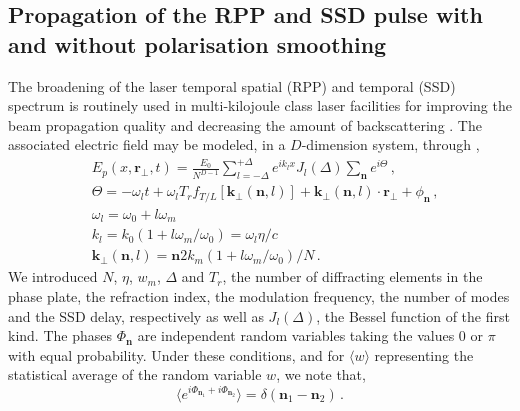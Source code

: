 \documentclass[
 reprint,
 amsmath,amssymb,
 aps,
]{revtex4-1}
\begin{document}
\subsection{Propagation of the RPP and  SSD pulse with and without polarisation smoothing}
The broadening of the  laser temporal spatial (RPP) and temporal (SSD) spectrum \cite{Kato_1984,Skupski_1989} is  routinely used in multi-kilojoule class laser facilities for improving the beam propagation quality \cite[]{NatPhys_Glenzer,NatPhys_Labaune,POP_Delamater_2000} and decreasing the amount of backscattering \cite[]{POP_Duluc_2019}. 
The associated electric field may be modeled, in a $D$-dimension system,  through \cite[]{POP_Rose_98,Rothenberg_97,Videau_1999}, 
\begin{align}
    &E_p(x,\mathbf{r}_\perp,t) =\frac{E_0}{N^{D-1}} \sum_{l=-\Delta}^{+\Delta}  e^{i k_l x }J_l(\Delta) \sum_{\mathbf{n} }  
    e^{i\Theta}
    \, , \label{eq:essd}  \\
   & \Theta = -\omega_lt +\omega_l T_{r} f_{T/L}[\mathbf{k}_\perp(\mathbf{n},l)] + \mathbf{k}_\perp(\mathbf{n},l)\cdot \mathbf{r}_\perp +\phi_{\mathbf{n}} \, ,\\
   & \omega_l= \omega_0+l \omega_m \\
   & k_l = k_0(1+l\omega_m/\omega_0 ) = \omega_l\eta /c \\
    &\mathbf{k}_{\perp }( \mathbf{n},l)= \mathbf{n}  2k_m(1+l\omega_m/\omega_0 )/N\, .\label{eq:kp}
\end{align}
We introduced $N$, $\eta$, $ w_m$, $\Delta$ and $T_{r}$, the number of diffracting elements in the phase plate, the refraction index, the modulation frequency, the number of modes and the SSD delay, respectively as well as  $J_l(\Delta)$, the Bessel function of the first kind.
The phases $\Phi_{\mathbf{n}}$ are independent random variables taking the values $0$ or $\pi$ with equal probability.
Under these conditions, and for $\langle w\rangle$ representing the statistical average of the random variable $w$,   we note   that,
 \begin{equation}\label{eq:d}
 \langle e^{i\Phi_{\mathbf{n}_1}+i\Phi_{\mathbf{n}_2}}\rangle=\delta(\mathbf{n}_1-\mathbf{n}_2) \, .
 \end{equation}
 
\end{document}
